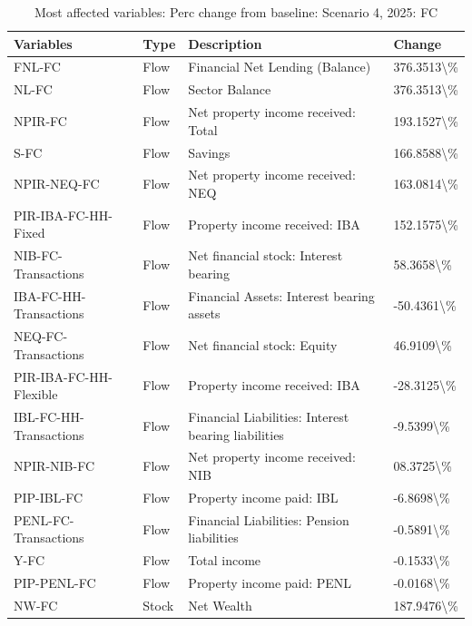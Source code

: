\documentclass[
]{book}
\begin{document}
\begin{table}

\caption{\label{tab:most-affected-Scenario-4-2025-perc-FC}Most affected variables: Perc change from baseline: Scenario 4, 2025: FC}
\centering
\fontsize{10}{12}\selectfont
\begin{tabular}[t]{l|l|l|l}
\hline
Variables & Type & Description & Change\\
\hline
FNL-FC & Flow & Financial Net Lending (Balance) & 376.3513\textbackslash{}\%\\
\hline
NL-FC & Flow & Sector Balance & 376.3513\textbackslash{}\%\\
\hline
NPIR-FC & Flow & Net property income received: Total & 193.1527\textbackslash{}\%\\
\hline
S-FC & Flow & Savings & 166.8588\textbackslash{}\%\\
\hline
NPIR-NEQ-FC & Flow & Net property income received: NEQ & 163.0814\textbackslash{}\%\\
\hline
PIR-IBA-FC-HH-Fixed & Flow & Property income received: IBA & 152.1575\textbackslash{}\%\\
\hline
NIB-FC-Transactions & Flow & Net financial stock: Interest bearing & 58.3658\textbackslash{}\%\\
\hline
IBA-FC-HH-Transactions & Flow & Financial Assets: Interest bearing assets & -50.4361\textbackslash{}\%\\
\hline
NEQ-FC-Transactions & Flow & Net financial stock: Equity & 46.9109\textbackslash{}\%\\
\hline
PIR-IBA-FC-HH-Flexible & Flow & Property income received: IBA & -28.3125\textbackslash{}\%\\
\hline
IBL-FC-HH-Transactions & Flow & Financial Liabilities: Interest bearing liabilities & -9.5399\textbackslash{}\%\\
\hline
NPIR-NIB-FC & Flow & Net property income received: NIB & 08.3725\textbackslash{}\%\\
\hline
PIP-IBL-FC & Flow & Property income paid: IBL & -6.8698\textbackslash{}\%\\
\hline
PENL-FC-Transactions & Flow & Financial Liabilities: Pension liabilities & -0.5891\textbackslash{}\%\\
\hline
Y-FC & Flow & Total income & -0.1533\textbackslash{}\%\\
\hline
PIP-PENL-FC & Flow & Property income paid: PENL & -0.0168\textbackslash{}\%\\
\hline
NW-FC & Stock & Net Wealth & 187.9476\textbackslash{}\%\\

\end{tabular}
\end{table}
\end{document}
